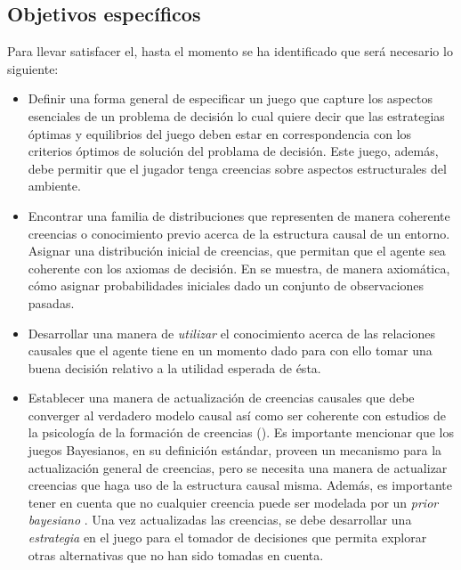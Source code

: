 \documentclass[11pt]{article}
\theoremstyle{plain}
\begin{document}
\subsection{Objetivos específicos}
Para llevar satisfacer el, hasta el momento se ha identificado que será necesario lo siguiente:
\begin{itemize}
\item Definir una forma general de especificar un juego que capture los aspectos esenciales de un problema de decisión lo cual quiere decir que las estrategias óptimas y equilibrios del juego deben estar en correspondencia con los criterios óptimos de solución del problama de decisión. Este juego, además, debe permitir que el jugador tenga creencias sobre aspectos estructurales del ambiente. 

\item Encontrar una familia de distribuciones que representen de manera coherente creencias o conocimiento previo acerca de la estructura causal de un entorno. Asignar una distribución inicial de creencias, que permitan que el agente sea coherente con los axiomas de decisión. En \cite{billot2005probabilities} se muestra, de manera axiomática, cómo asignar probabilidades iniciales dado un conjunto de observaciones pasadas.

\item Desarrollar una manera de \textit{utilizar} el conocimiento acerca de las relaciones causales que el agente tiene en un momento dado para con ello tomar una buena decisión relativo a la utilidad esperada de ésta.


\item Establecer una manera de actualización de creencias causales que debe converger al verdadero modelo causal así como ser coherente con estudios de la psicología de la formación de creencias (\cite{larrouy2017mindreading}). Es importante mencionar que los juegos Bayesianos, en su definición estándar, proveen un mecanismo para la actualización general de creencias, pero se necesita una manera de actualizar creencias que haga uso de la estructura causal misma. Además, es importante tener en cuenta que no cualquier creencia puede ser modelada por un \textit{prior bayesiano} \cite{gilboa2016ambiguity}. Una vez actualizadas las creencias, se debe desarrollar una \textit{estrategia} en el juego para el tomador de decisiones que permita explorar otras alternativas que no han sido tomadas en cuenta.


\end{itemize}
\end{document}
